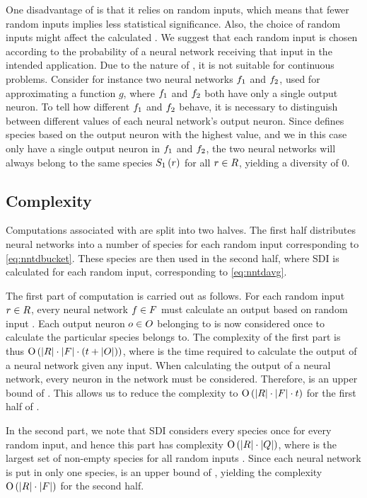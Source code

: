 One disadvantage of \dia{} is that it relies on random inputs, which means that fewer random inputs implies less statistical significance. Also, the choice of random inputs might affect the calculated \dia. We suggest that each random input is chosen according to the probability of a neural network receiving that input in the intended application. 
Due to the nature of \dia, it is not suitable for continuous problems. Consider for instance two neural networks $f_1$ and $f_2$, used for approximating a function $g$, where $f_1$ and $f_2$ both have only a single output neuron. To tell how different $f_1$ and $f_2$ behave, it is necessary to distinguish between different values of each neural network's output neuron. Since \dia{} defines species based on the output neuron with the highest value, and we in this case only have a single output neuron in $f_1$ and $f_2$, the two neural networks will always belong to the same species $S_{1}\left(r\right)$ for all $r \in R$, yielding a diversity of 0.  

\subsection{Complexity}
Computations associated with \dia{} are split into two halves. The first half distributes neural networks into a number of species for each random input corresponding to \cref{eq:nntdbucket}. These species are then used in the second half, where SDI is calculated for each random input, corresponding to \cref{eq:nntdavg}.

The first part of computation is carried out as follows. For each random input $r \in R$, every neural network $f \in F$ must calculate an output based on random input \ran. Each output neuron $o \in O$ belonging to \ind{} is now considered once to calculate the particular species \ind{} belongs to. The complexity of the first part is thus $\operatorname{O}\left(\lvert R\rvert \cdot \lvert F\rvert \cdot \left(t + \lvert O\rvert\right)\right)$, where \timet{} is the time required to calculate the output of a neural network given any input. When calculating the output of a neural network, every neuron in the network must be considered. Therefore, \timet{} is an upper bound of \nnoutsetl. This allows us to reduce the complexity to $\operatorname{O}\left(\lvert R\rvert \cdot \lvert F\rvert \cdot t\right)$ for the first half of \dia.

In the second part, we note that SDI considers every species once for every random input, and hence this part has complexity $\operatorname{O}\left(\lvert R\rvert\cdot\lvert Q\rvert\right)$, where \nemptyspeciesset{} is the largest set of non-empty species for all random inputs \ranset. Since each neural network is put in only one species, \indsetl{} is an upper bound of \nemptyspeciessetl, yielding the complexity $\operatorname{O}\left(\lvert R\rvert\cdot\lvert F\rvert\right)$ for the second half.

